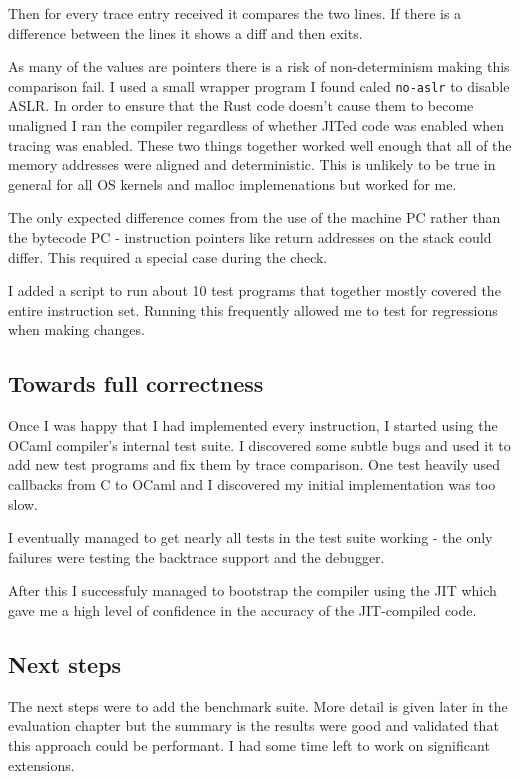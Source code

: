 Then for every trace entry received it compares the two lines. If there is a difference between the
lines
it shows a diff and then exits.

As many of the values are pointers there is a risk of non-determinism making this comparison fail.
I used a small wrapper program I found caled \texttt{no-aslr} to disable ASLR. In order to ensure
that the Rust code doesn't cause them to become unaligned I ran the compiler regardless of whether
JITed code was enabled when tracing was enabled. These two things together worked well enough that
all of the memory addresses were aligned and deterministic. This is unlikely to be true in general
for all OS kernels and malloc implemenations but worked for me.

The only expected difference comes from the use of the machine PC rather than the bytecode PC -
instruction pointers like return addresses on the stack could differ. This required a special case
during the check.

I added a script to run about 10 test programs that together mostly covered the entire instruction
set. Running this frequently allowed me to test for regressions when making changes.

\subsection{Towards full correctness}

Once I was happy that I had implemented every instruction, I started using
the OCaml compiler's internal test suite. I discovered some subtle bugs and used it to add new test
programs and fix them by trace comparison. One test heavily used callbacks from C to OCaml and I
discovered my initial implementation was too slow.

I eventually managed to get nearly all tests in the test suite working - the only failures were
testing the backtrace support and the debugger.

After this I successfuly managed to bootstrap the compiler using the JIT which gave me a high level
of confidence in the accuracy of the JIT-compiled code.

\subsection{Next steps}

The next steps were to add the benchmark suite. More detail is given later in the evaluation
chapter but the summary is the results were good and validated that this approach could be
performant. I had some time left to work on significant extensions.


